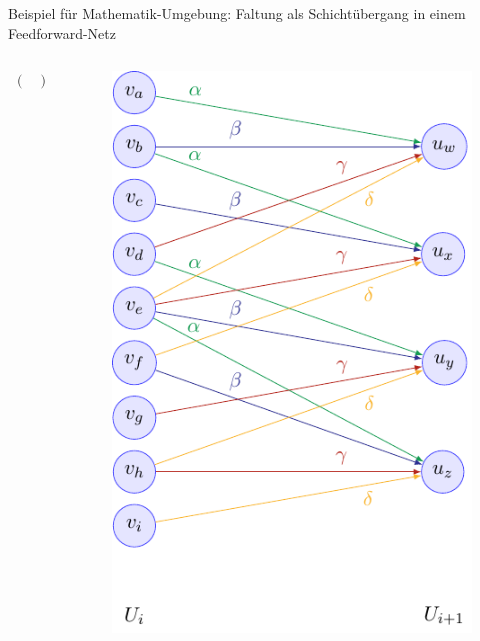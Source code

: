 \documentclass[
  scale = 1.5,
  advisor = {{https://github.com/nachos-con-queso/HFT-Poster}},
  authorLabel = {{(jens@calov.net)}},
  advisorLabel = {{(Download-URL)}},
]{hftpostr}
\begin{document}
\begin{frame}[fragile, t]
\begin{block}{Beispiel für Mathematik-Umgebung: Faltung als Schichtübergang in einem Feedforward-Netz}
\begin{columns}[onlytextwidth, T]
\begin{column}{0.42\textwidth}
\begin{align*}
\begin{pmatrix}
    		\end{pmatrix}
    \end{align*}
      \end{column}
      \begin{column}{0.23\textwidth}
        \begin{center}
          \begin{figure}
            \includegraphics[width=.8\textwidth]{exampleFigure.pdf}
          \end{figure}
        \end{center}
      \end{column}
    \end{columns}

  \end{block}



\end{frame}
\end{document}
